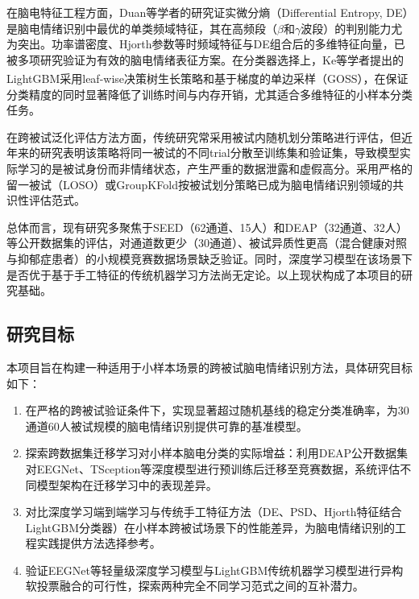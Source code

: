 \documentclass[UTF8,zihao=-4,fontset=windows]{ctexart}
\let\oldcite\cite
\renewcommand{\cite}[1]{\textsuperscript{\oldcite{#1}}}
\numberwithin{equation}{section}
\numberwithin{figure}{section}
\numberwithin{table}{section}
\begin{document}
在脑电特征工程方面，Duan等学者的研究证实微分熵（Differential Entropy, DE）是脑电情绪识别中最优的单类频域特征，其在高频段（$\beta$和$\gamma$波段）的判别能力尤为突出。功率谱密度、Hjorth参数等时频域特征与DE组合后的多维特征向量，已被多项研究验证为有效的脑电情绪表征方案。在分类器选择上，Ke等学者提出的LightGBM\cite{lightgbm}采用leaf-wise决策树生长策略和基于梯度的单边采样（GOSS），在保证分类精度的同时显著降低了训练时间与内存开销，尤其适合多维特征的小样本分类任务。

在跨被试泛化评估方法方面，传统研究常采用被试内随机划分策略进行评估，但近年来的研究表明该策略将同一被试的不同trial分散至训练集和验证集，导致模型实际学习的是被试身份而非情绪状态，产生严重的数据泄露和虚假高分。采用严格的留一被试（LOSO）或GroupKFold按被试划分策略已成为脑电情绪识别领域的共识性评估范式。

总体而言，现有研究多聚焦于SEED（62通道、15人）和DEAP（32通道、32人）等公开数据集的评估，对通道数更少（30通道）、被试异质性更高（混合健康对照与抑郁症患者）的小规模竞赛数据场景缺乏验证。同时，深度学习模型在该场景下是否优于基于手工特征的传统机器学习方法尚无定论。以上现状构成了本项目的研究基础。

\subsection{研究目标}

本项目旨在构建一种适用于小样本场景的跨被试脑电情绪识别方法，具体研究目标如下：

\begin{enumerate}[label={(\arabic*)}, labelindent=2em, leftmargin=4.5em, itemindent=0pt, labelsep=0.5em]
    \item 在严格的跨被试验证条件下，实现显著超过随机基线的稳定分类准确率，为30通道60人被试规模的脑电情绪识别提供可靠的基准模型。
    \item 探索跨数据集迁移学习对小样本脑电分类的实际增益：利用DEAP公开数据集对EEGNet、TSception等深度模型进行预训练后迁移至竞赛数据，系统评估不同模型架构在迁移学习中的表现差异。
    \item 对比深度学习端到端学习与传统手工特征方法（DE、PSD、Hjorth特征结合LightGBM分类器）在小样本跨被试场景下的性能差异，为脑电情绪识别的工程实践提供方法选择参考。
    \item 验证EEGNet等轻量级深度学习模型与LightGBM传统机器学习模型进行异构软投票融合的可行性，探索两种完全不同学习范式之间的互补潜力。
\end{enumerate}

\end{document}
